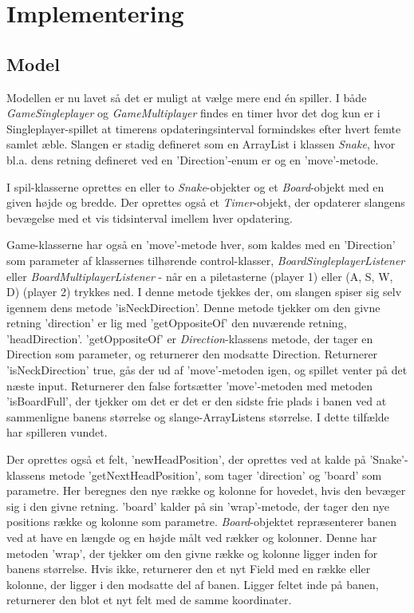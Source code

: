 
\section{Implementering}
\subsection{Model}
Modellen er nu lavet så det er muligt at vælge mere end én spiller. I både \textit{GameSingleplayer} og \textit{GameMultiplayer} findes en timer hvor det dog kun er i Singleplayer-spillet at timerens opdateringsinterval formindskes efter hvert femte samlet æble. Slangen er stadig defineret som en ArrayList i klassen \textit{Snake}, hvor bl.a. dens retning defineret ved en 'Direction'-enum er og en 'move'-metode. 
\linebreak

I spil-klasserne oprettes en eller to \textit{Snake}-objekter og et \textit{Board}-objekt med en given højde og bredde. Der oprettes også et \textit{Timer}-objekt, der opdaterer slangens bevægelse med et vis tidsinterval imellem hver opdatering.  


Game-klasserne har også en 'move'-metode hver, som kaldes med en 'Direction' som parameter af klassernes tilhørende control-klasser, \textit{BoardSingleplayerListener} eller \textit{BoardMultiplayerListener} - når en a piletasterne (player 1) eller (A, S, W, D) (player 2) trykkes ned. I denne metode tjekkes der, om slangen spiser sig selv igennem dens metode 'isNeckDirection'. Denne metode tjekker om den givne retning 'direction' er lig med 'getOppositeOf' den nuværende retning, 'headDirection'. 'getOppositeOf' er \textit{Direction}-klassens metode, der tager en Direction som parameter, og returnerer den modsatte Direction. Returnerer 'isNeckDirection' true, gås der ud af 'move'-metoden igen, og spillet venter på det næste input. Returnerer den false fortsætter 'move'-metoden med metoden 'isBoardFull', der tjekker om det er det er den sidste frie plads i banen ved at sammenligne banens størrelse og slange-ArrayListens størrelse. I dette tilfælde har spilleren vundet.
\linebreak

Der oprettes også et felt, 'newHeadPosition', der oprettes ved at kalde på 'Snake'-klassens metode 'getNextHeadPosition', som tager 'direction' og 'board' som parametre. Her beregnes den nye række og kolonne for hovedet, hvis den bevæger sig i den givne retning. 'board' kalder på sin 'wrap'-metode, der tager den nye positions række og kolonne som parametre. \textit{Board}-objektet repræsenterer banen ved at have en længde og en højde målt ved rækker og kolonner. Denne har metoden 'wrap', der tjekker om den givne række og kolonne ligger inden for banens størrelse. Hvis ikke, returnerer den et nyt Field med en række eller kolonne, der ligger i den modsatte del af banen. Ligger feltet inde på banen, returnerer den blot et nyt felt med de samme koordinater.
\linebreak

